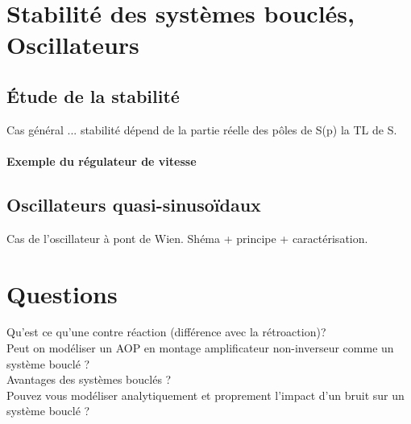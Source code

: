 \documentclass[12pt,prb,aps,epsf]{report}
\begin{document}
\section{Stabilité des systèmes bouclés, Oscillateurs}
\subsection{Étude de la stabilité}
Cas général ... stabilité dépend de la partie réelle des pôles de S(p) la TL de S.
\paragraph{Exemple du régulateur de vitesse}
\subsection{Oscillateurs quasi-sinusoïdaux}
Cas de l'oscillateur à pont de Wien. Shéma + principe + caractérisation.

\section{Questions}
Qu'est ce qu'une contre réaction (différence avec la rétroaction)?\\

Peut on modéliser un AOP en montage amplificateur non-inverseur comme un système bouclé ?\\

Avantages des systèmes bouclés ?\\

Pouvez vous modéliser analytiquement et proprement l'impact d'un bruit sur un système bouclé ?
\end{document}
